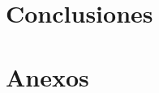 \documentclass{article}
\begin{document}
            
            
            
    \section{Conclusiones}

    \section{Anexos}
\end{document}
